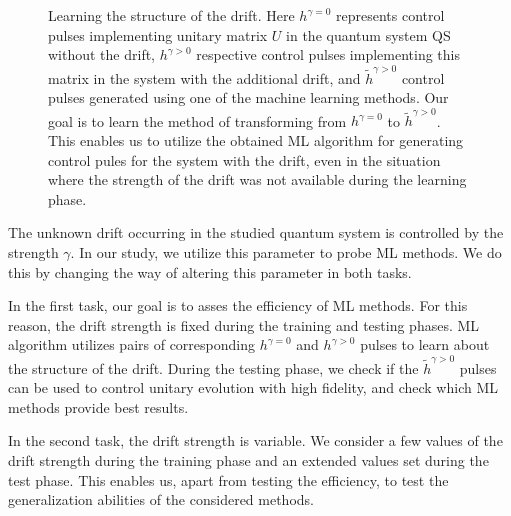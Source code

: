 \documentclass[aps,pra,showkeys,showpacs,notitlepage,superscriptaddress]{revtex4-1}
\newcommand{\1}{{\rm 1\hspace{-0.9mm}l}}
\newcommand{\NCP}{\ensuremath{h^{\gamma=0}}\xspace}
\newcommand{\DCP}{\ensuremath{h^{\gamma >0}}\xspace}
\newcommand{\nnDCP}{\ensuremath{\tilde{h}^{\gamma >0}}\xspace}
\begin{document}
\begin{figure}[ht!]
{\label{fig:correction_scheme}
    }  
    
    \caption{Learning the structure of the drift. Here $\NCP$ represents control
    pulses implementing unitary matrix $U$ in the quantum system QS without the drift, 
    $\DCP$ respective control pulses implementing this matrix in the 
    system with the additional drift, and $\nnDCP$ control pulses generated
    using one of the machine learning methods. Our goal is to learn the method of 
    transforming from \NCP to \nnDCP. This enables us to utilize the obtained ML
    algorithm for generating control pules for the system with the drift, even
    in the situation where the strength of the drift was not available during
    the learning phase.}
    \label{fig:task-overview}
\end{figure}

The unknown drift occurring in the studied quantum system is controlled by the
strength $\gamma$. In our study, we utilize this parameter to probe ML methods.
We do this by changing the way of altering this parameter in both tasks.

In the first task, our goal is to asses the efficiency of ML methods. For this
reason, the drift strength is fixed during the training and testing phases. ML
algorithm utilizes pairs of corresponding $\NCP$ and $\DCP$ pulses to learn
about the structure of the drift. During the testing phase, we check if the
$\nnDCP$ pulses can be used to control unitary evolution with high fidelity, and
check which ML methods provide best results.  

In the second task, the drift strength is variable. We consider a few values of 
the drift strength during the training phase and an extended values set during the test 
phase. This enables us, apart from testing the efficiency, to test the generalization 
abilities of the considered methods.
\end{document}
